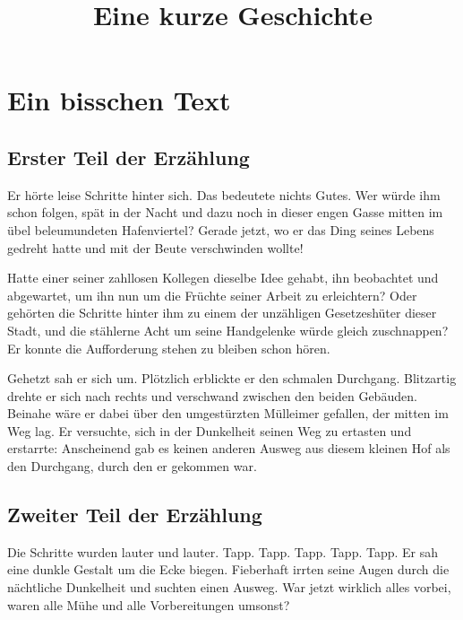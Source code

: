 \documentclass[a4paper]{article}
\title{Eine kurze Geschichte}
\date{}
\begin{document}
\maketitle

\section{Ein bisschen Text}

\subsection{Erster Teil der Erzählung}

Er hörte leise Schritte hinter sich. Das bedeutete nichts Gutes. Wer würde ihm schon folgen, spät in der Nacht und dazu noch in dieser engen Gasse mitten im übel beleumundeten Hafenviertel? Gerade jetzt, wo er das Ding seines Lebens gedreht hatte und mit der Beute verschwinden wollte!

Hatte einer seiner zahllosen Kollegen dieselbe Idee gehabt, ihn beobachtet und abgewartet, um ihn nun um die Früchte seiner Arbeit zu erleichtern? Oder gehörten die Schritte hinter ihm zu einem der unzähligen Gesetzeshüter dieser Stadt, und die stählerne Acht um seine Handgelenke würde gleich zuschnappen? Er konnte die Aufforderung stehen zu bleiben schon hören.

Gehetzt sah er sich um. Plötzlich erblickte er den schmalen Durchgang. Blitzartig drehte er sich nach rechts und verschwand zwischen den beiden Gebäuden. Beinahe wäre er dabei über den umgestürzten Mülleimer gefallen, der mitten im Weg lag. Er versuchte, sich in der Dunkelheit seinen Weg zu ertasten und erstarrte: Anscheinend gab es keinen anderen Ausweg aus diesem kleinen Hof als den Durchgang, durch den er gekommen war.



\subsection{Zweiter Teil der Erzählung}

Die Schritte wurden lauter und lauter. Tapp. Tapp. Tapp. Tapp. Tapp. Er sah eine dunkle Gestalt um die Ecke biegen. Fieberhaft irrten seine Augen durch die nächtliche Dunkelheit und suchten einen Ausweg. War jetzt wirklich alles vorbei, waren alle Mühe und alle Vorbereitungen umsonst?
\end{document}
